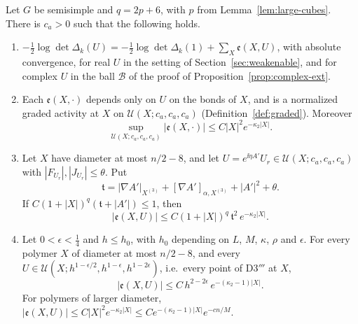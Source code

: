 \begin{proposition}\label{prop:one-loop-polymer}
Let $G$ be semisimple and $q=2p+6$, with $p$ from Lemma~\ref{lem:large-cubes}. There is $c_a>0$ such that the following holds.
\begin{enumerate}[label=(\alph*)]
\item $-\frac12\log\det\Delta_k(U)=-\frac12\log\det\Delta_k(1)+\sum_X\mathfrak e(X,U)$, with absolute convergence, for real $U$ in the setting of Section~\ref{sec:weakenable}, and for complex $U$ in the ball $\mathcal B$ of the proof of Proposition~\ref{prop:complex-ext}.
\item Each $\mathfrak e(X,\cdot)$ depends only on $U$ on the bonds of $X$, and is a normalized graded activity at $X$ on $\mathcal U(X;c_a,c_a,c_a)$ (Definition~\ref{def:graded}). Moreover
\[
\sup_{\mathcal U(X;c_a,c_a,c_a)}|\mathfrak e(X,\cdot)|\le C|X|^2e^{-\kappa_2|X|} .
\]
\item Let $X$ have diameter at most $n/2-8$, and let $U=e^{\ii\eta A'}U_r\in\mathcal U(X;c_a,c_a,c_a)$ with $|F_{U_r}|,|J_{U_r}|\le\theta$. Put
\[
\mathfrak t=|\nabla A'|_{X^{(3)}}+[\nabla A']_{\alpha,X^{(3)}}+|A'|^2+\theta .
\]
If $C(1+|X|)^q(\mathfrak t+|A'|)\le1$, then
\[
|\mathfrak e(X,U)|\le C(1+|X|)^q\,\mathfrak t^2\,e^{-\kappa_2|X|} .
\]
\item Let $0<\epsilon<\frac14$ and $h\le h_0$, with $h_0$ depending on $L$, $M$, $\kappa$, $\rho$ and $\epsilon$. For every polymer $X$ of diameter at most $n/2-8$, and every $U\in\mathcal U(X;h^{1-\epsilon/2},h^{1-\epsilon},h^{1-2\epsilon})$, i.e.\ every point of D3$'''$ at $X$,
\[
|\mathfrak e(X,U)|\le C\,h^{2-2\epsilon}\,e^{-(\kappa_2-1)|X|} .
\]
For polymers of larger diameter, $|\mathfrak e(X,U)|\le C|X|^2e^{-\kappa_2|X|}\le Ce^{-(\kappa_2-1)|X|}e^{-cn/M}$.
\end{enumerate}
\end{proposition}

